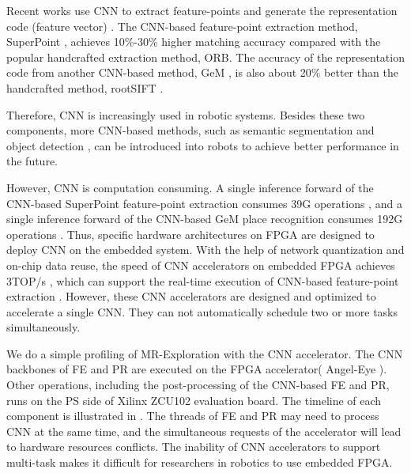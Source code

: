 Recent works use CNN to extract feature-points \cite{detone2018superpoint, simo2015discriminative, yi2016lift} and generate the representation code (feature vector) \cite{arandjelovic2016netvlad, radenovic2018fine}. 
The CNN-based feature-point extraction method, SuperPoint \cite{detone2018superpoint}, achieves 10\%-30\% higher matching accuracy compared with the popular handcrafted extraction method, ORB\cite{Mur-Artal:2017281}.
The accuracy of the representation code from another CNN-based method, GeM \cite{radenovic2018fine}, is also about 20\% better than the handcrafted method, rootSIFT \cite{jegou2014triang}.

Therefore, CNN is increasingly used in robotic systems. 
Besides these two components, more CNN-based methods, such as semantic segmentation \cite{long2015fully} and object detection \cite{ren2015faster}, can be introduced into robots to achieve better performance in the future.

However, CNN is computation consuming. A single inference forward of the CNN-based SuperPoint feature-point extraction consumes 39G operations \cite{detone2018superpoint}, and a single inference forward of the CNN-based GeM \cite{radenovic2018fine} place recognition consumes 192G operations \cite{radenovic2018fine}.
Thus, specific hardware architectures on FPGA \cite{guo2017angel,yu2018instruction,li_high_2016,qiu2016going,lu_evaluating_2017} are designed to deploy CNN on the embedded system.
With the help of network quantization and on-chip data reuse, the speed of CNN accelerators on embedded FPGA achieves 3TOP/s \cite{lu_evaluating_2017}, which can support the real-time execution of CNN-based feature-point extraction \cite{detone2018superpoint}.
However, these CNN accelerators are designed and optimized to accelerate a single CNN. They can not automatically schedule two or more tasks simultaneously. 



We do a simple profiling of MR-Exploration with the CNN accelerator. The CNN backbones of FE and  PR are executed on the FPGA accelerator( Angel-Eye\cite{guo2017angel} ).
Other operations, including the post-processing of the CNN-based FE and PR, runs on the PS side of Xilinx ZCU102 evaluation board\cite{zcu102}. The timeline of each component is illustrated in . 
The threads of FE and PR may need to process CNN at the same time,  and the simultaneous requests of the accelerator will lead to hardware resources conflicts. The inability of CNN accelerators to support multi-task makes it difficult for researchers in robotics to use embedded FPGA.

